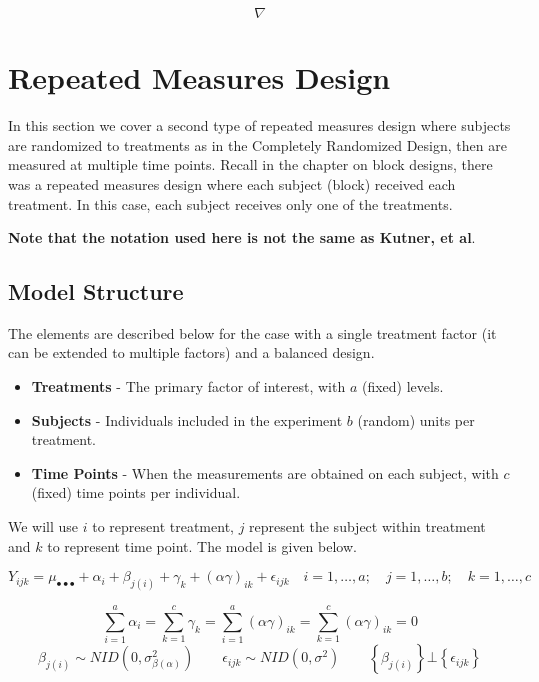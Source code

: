 \documentclass[
]{book}
\providecommand{\tightlist}{%
  \setlength{\itemsep}{0pt}\setlength{\parskip}{0pt}}
\begin{document}
\[ \nabla \]

\section{Repeated Measures Design}\label{repeated-measures-design}

In this section we cover a second type of repeated measures design where
subjects are randomized to treatments as in the Completely Randomized
Design, then are measured at multiple time points. Recall in the chapter
on block designs, there was a repeated measures design where each
subject (block) received each treatment. In this case, each subject
receives only one of the treatments.

\textbf{Note that the notation used here is not the same as Kutner, et
al}.

\subsection{Model Structure}\label{model-structure}

The elements are described below for the case with a single treatment
factor (it can be extended to multiple factors) and a balanced design.

\begin{itemize}
\tightlist
\item
  \textbf{Treatments} - The primary factor of interest, with \(a\)
  (fixed) levels.
\item
  \textbf{Subjects} - Individuals included in the experiment \(b\)
  (random) units per treatment.
\item
  \textbf{Time Points} - When the measurements are obtained on each
  subject, with \(c\) (fixed) time points per individual.
\end{itemize}

We will use \(i\) to represent treatment, \(j\) represent the subject
within treatment and \(k\) to represent time point. The model is given
below.

\[
Y_{ijk}=\mu_{\bullet\bullet\bullet} + \alpha_i + \beta_{j(i)} +
\gamma_k + (\alpha\gamma)_{ik} + \epsilon_{ijk}  \quad
i=1,\ldots,a; \quad j=1,\ldots,b; \quad k=1,\ldots,c
\]

\[
\sum_{i=1}^a\alpha_i=\sum_{k=1}^c\gamma_k=
\sum_{i=1}^a(\alpha\gamma)_{ik}=\sum_{k=1}^c(\alpha\gamma)_{ik}=0
\] \[
\beta_{j(i)} \sim NID\left(0,\sigma_{\beta(\alpha)}^2\right) \qquad
\epsilon_{ijk} \sim NID\left(0,\sigma^2\right) \qquad
\left\{\beta_{j(i)}\right\} \bot
\left\{\epsilon_{ijk}\right\}
\]
\end{document}
